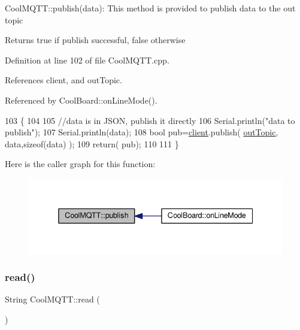 Cool\+M\+Q\+T\+T\+::publish(data)\+: This method is provided to publish data to the out topic

\begin{DoxyReturn}{Returns}
true if publish successful, false otherwise 
\end{DoxyReturn}


Definition at line 102 of file Cool\+M\+Q\+T\+T.\+cpp.



References client, and out\+Topic.



Referenced by Cool\+Board\+::on\+Line\+Mode().


\begin{DoxyCode}
103 \{
104 
105     \textcolor{comment}{//data is in JSON, publish it directly}
106     Serial.println(\textcolor{stringliteral}{"data to publish"});
107     Serial.println(data);
108     \textcolor{keywordtype}{bool} pub=\hyperlink{classCoolMQTT_a4ca71e4f76ef868692a297efd45b1415}{client}.publish( \hyperlink{classCoolMQTT_a109c786a17b463f9eeba046194279522}{outTopic}, data,\textcolor{keyword}{sizeof}(data) );
109     \textcolor{keywordflow}{return}( pub);
110 
111 \}
\end{DoxyCode}
Here is the caller graph for this function\+:
\nopagebreak
\begin{figure}[H]
\begin{center}
\leavevmode
\includegraphics[width=338pt]{classCoolMQTT_ace977b3e90ab14b1199fe5c4fb0a13ec_icgraph}
\end{center}
\end{figure}
\mbox{\label{classCoolMQTT_ae3c18f6ae9723746d32765f1c8f176ca}} 
\subsubsection{\texorpdfstring{read()}{read()}}
{\footnotesize\ttfamily String Cool\+M\+Q\+T\+T\+::read (\begin{DoxyParamCaption}{ }\end{DoxyParamCaption})}

